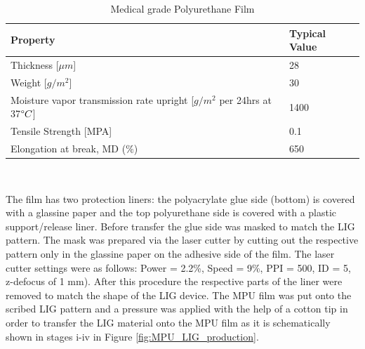 \begin{table}[H]
\centering
    \caption[Caption for LOF]{Medical grade Polyurethane Film \cite{Fixomull_tech_data}}
    
    \label{tab:MPU_tech} 
\medskip
\medskip
\begin{tabular}{ l | l } 

Property & Typical Value  \\[15px]
\hline

Thickness [$\mu m$] & 28 \\[15px]
Weight [$g/m^2$] & 30 \\[15px]
Moisture vapor transmission rate upright [$g/m^2$ per 24hrs at 37$\degree C$] & 1400\\[15px]
Tensile Strength [MPA] & 0.1\\[15px]
Elongation at break, MD ($\%$) & 650\\[15px]

\end{tabular}
\\[15px]

\end{table}


The film has two protection liners: the polyacrylate glue side (bottom) is covered with a glassine paper and the top polyurethane side is covered with a plastic support/release liner. Before transfer the glue side was masked to match the LIG pattern. The mask was prepared via the laser cutter by cutting out the respective pattern only in the glassine paper on the adhesive side of the film. The laser cutter settings were as follows: Power = 2.2\%, Speed = 9\%, PPI = 500, ID = 5, z-defocus of 1 mm). After this procedure the respective parts of the liner were removed to match the shape of the LIG device. The MPU film was put onto the scribed LIG pattern and a pressure was applied with the help of a cotton tip in order to transfer the LIG material onto the MPU film as it is schematically shown in stages i-iv in Figure \ref{fig:MPU_LIG_production}. 

